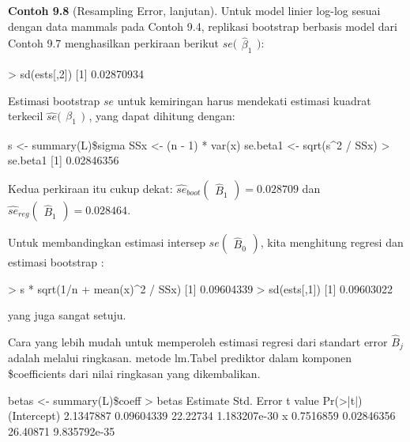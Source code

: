 \documentclass[a4paper,12pt]{article}
\theoremstyle{definition}
\begin{document}
\textbf{Contoh 9.8} (Resampling Error, lanjutan). Untuk model linier log-log sesuai dengan data mammals pada Contoh 9.4, replikasi bootstrap berbasis model dari Contoh 9.7 menghasilkan perkiraan berikut $se \bigl(\begin{smallmatrix}
\widehat{\beta }_{1}
\end{smallmatrix}\bigr)$:

\begin{spverbatim}
> sd(ests[,2])
[1] 0.02870934
\end{spverbatim}

Estimasi bootstrap $se$ untuk kemiringan harus mendekati estimasi kuadrat terkecil $\widehat{se}\bigl(\begin{smallmatrix}
\beta_{1} 
\end{smallmatrix}\bigr)$ , yang dapat dihitung dengan:

\begin{spverbatim}
s <- summary(L)\$sigma
SSx <- (n - 1) * var(x)
se.beta1 <- sqrt(s^2 / SSx)
> se.beta1
[1] 0.02846356
\end{spverbatim}

Kedua perkiraan itu cukup dekat: $\widehat{se}_{boot}  \begin{pmatrix}
\widehat{B}_{1}
\end{pmatrix} = 0.028709$ dan $\widehat{se}_{reg}  \begin{pmatrix}
\widehat{B}_{1}
\end{pmatrix} = 0.028464$.

Untuk membandingkan estimasi intersep $se  \begin{pmatrix}
\widehat{B}_{0}
\end{pmatrix}$, kita menghitung regresi dan estimasi bootstrap :

\begin{spverbatim}
> s * sqrt(1/n + mean(x)^2 / SSx)
[1] 0.09604339
> sd(ests[,1])
[1] 0.09603022
\end{spverbatim}

yang juga sangat setuju.

Cara yang lebih mudah untuk memperoleh estimasi regresi dari standart error $\widehat{B}_{j}$ adalah melalui ringkasan. metode lm.Tabel prediktor dalam komponen \$coefficients dari nilai ringkasan yang dikembalikan.

\begin{spverbatim}
betas <- summary(L)\$coeff
> betas
            Estimate    Std. Error  t value         Pr(>|t|)
(Intercept) 2.1347887   0.09604339  22.22734    1.183207e-30
x           0.7516859   0.02846356  26.40871    9.835792e-35
\end{spverbatim}
\end{document}
